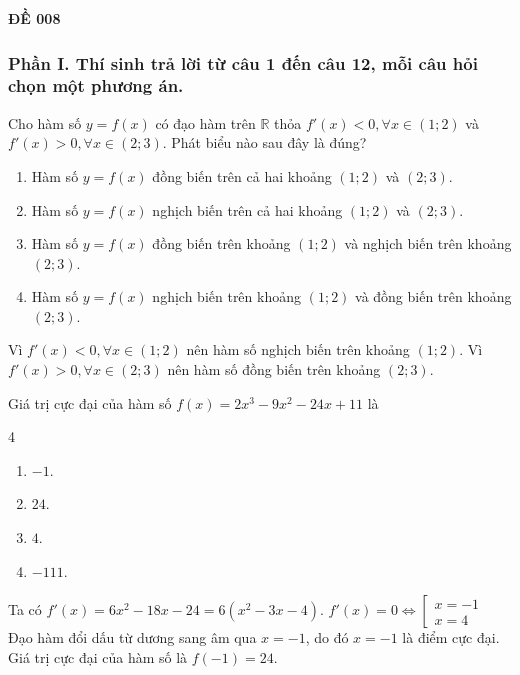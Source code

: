 \begin{center}
	\textbf{{\Huge ĐỀ 008}}
\end{center}
\subsubsection*{Phần I. Thí sinh trả lời từ câu 1 đến câu 12, mỗi câu hỏi chọn một phương án.}
\setcounter{bt}{0}\setcounter{bt}{0}
\begin{baitap}
	Cho hàm số $y=f(x)$ có đạo hàm trên $\mathbb{R}$ thỏa $f'(x) < 0, \forall x \in (1; 2)$ và $f'(x) > 0, \forall x \in (2; 3)$. Phát biểu nào sau đây là đúng?
	\begin{enumerate}
		\item Hàm số $y=f(x)$ đồng biến trên cả hai khoảng $(1; 2)$ và $(2; 3)$.
		\item Hàm số $y=f(x)$ nghịch biến trên cả hai khoảng $(1; 2)$ và $(2; 3)$.
		\item Hàm số $y=f(x)$ đồng biến trên khoảng $(1; 2)$ và nghịch biến trên khoảng $(2; 3)$.
		\item Hàm số $y=f(x)$ nghịch biến trên khoảng $(1; 2)$ và đồng biến trên khoảng $(2; 3)$.
	\end{enumerate}
	\begin{traloi}
		Vì $f'(x) < 0, \forall x \in (1; 2)$ nên hàm số nghịch biến trên khoảng $(1; 2)$.
		Vì $f'(x) > 0, \forall x \in (2; 3)$ nên hàm số đồng biến trên khoảng $(2; 3)$.
	\end{traloi}
\end{baitap}

\begin{baitap}
	Giá trị cực đại của hàm số $f(x) = 2x^3 - 9x^2 - 24x + 11$ là
	\begin{multicols}{4}
		\begin{enumerate}
			\item $-1$.
			\item $24$.
			\item $4$.
			\item $-111$.
		\end{enumerate}
	\end{multicols}
	\begin{traloi}
		\dapan{B}
		Ta có $f'(x) = 6x^2 - 18x - 24 = 6(x^2 - 3x - 4)$.
		$f'(x) = 0 \Leftrightarrow \left[
		\begin{array}{l}
			x = -1\\
			x = 4
		\end{array}
		\right.$
		Đạo hàm đổi dấu từ dương sang âm qua $x = -1$, do đó $x = -1$ là điểm cực đại.
		Giá trị cực đại của hàm số là $f(-1)  = 24$.
	\end{traloi}
\end{baitap}

